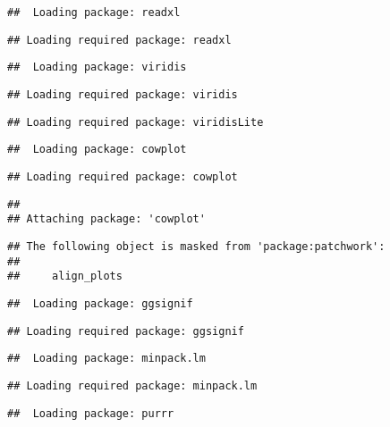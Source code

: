 \documentclass[
]{article}
\begin{document}
\begin{verbatim}
##  Loading package: readxl
\end{verbatim}

\begin{verbatim}
## Loading required package: readxl
\end{verbatim}

\begin{verbatim}
##  Loading package: viridis
\end{verbatim}

\begin{verbatim}
## Loading required package: viridis
\end{verbatim}

\begin{verbatim}
## Loading required package: viridisLite
\end{verbatim}

\begin{verbatim}
##  Loading package: cowplot
\end{verbatim}

\begin{verbatim}
## Loading required package: cowplot
\end{verbatim}

\begin{verbatim}
## 
## Attaching package: 'cowplot'
\end{verbatim}

\begin{verbatim}
## The following object is masked from 'package:patchwork':
## 
##     align_plots
\end{verbatim}

\begin{verbatim}
##  Loading package: ggsignif
\end{verbatim}

\begin{verbatim}
## Loading required package: ggsignif
\end{verbatim}

\begin{verbatim}
##  Loading package: minpack.lm
\end{verbatim}

\begin{verbatim}
## Loading required package: minpack.lm
\end{verbatim}

\begin{verbatim}
##  Loading package: purrr
\end{verbatim}
\end{document}
